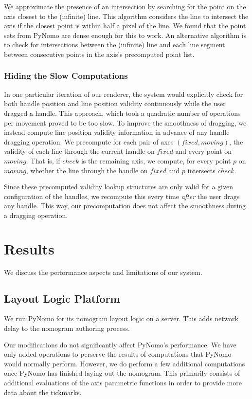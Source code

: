 \documentclass{proc}
\begin{document}
We approximate the presence of an intersection by searching for the
point on the axis closest to the (infinite) line.
This algorithm considers the line to intersect the axis if the closest
point is within half a pixel of the line.
We found that the point sets from PyNomo are dense enough for this to
work.
An alternative algorithm is to check for intersections between the
(infinite) line and each line segment between consecutive points in
the axis's precomputed point list.

\subsubsection{Hiding the Slow Computations}
In one particular iteration of our renderer, the system would
explicitly check for both handle position and line position validity
continuously while the user dragged a handle.
This approach, which took a quadratic number of operations per
movement proved to be too slow.
To improve the smoothness of dragging, we instead compute line
position validity information in advance of any handle dragging
operation.
We precompute for each pair of axes $(fixed, moving)$, the validity of
each line through the current handle on $fixed$ and every point on
$moving$.
That is, if $check$ is the remaining axis, we compute, for every point
$p$ on $moving$, whether the line through the handle on $fixed$ and
$p$ intersects $check$.

Since these precomputed validity lookup structures are only valid for
a given configuration of the handles, we recompute this every time
\emph{after} the user drags any handle.
This way, our precomputation does not affect the smoothness during a
dragging operation.

\section{Results}
We discuss the performance aspects and limitations of our system.

\subsection{Layout Logic Platform}
We run PyNomo for its nomogram layout logic on a server.
This adds network delay to the nomogram authoring process.

Our modifications do not significantly affect PyNomo's performance.
We have only added operations to perserve the results of computations
that PyNomo would normally perform.
However, we do perform a few additional computations once PyNomo has
finished laying out the nomogram.
This primarily consists of additional evaluations of the axis
parametric functions in order to provide more data about the
tickmarks.
\end{document}

